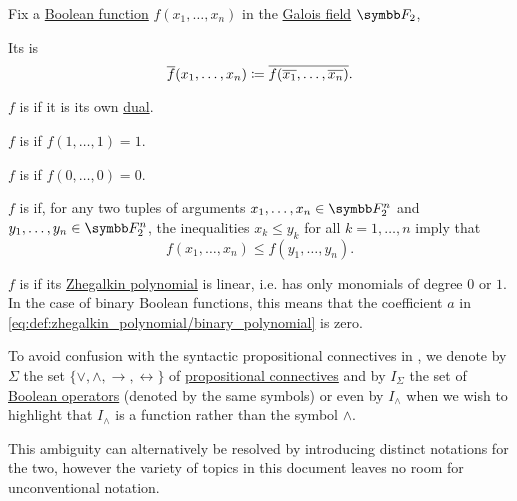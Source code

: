 \begin{definition}\label{def:boolean_functions_in_f2}
  Fix a \hyperref[def:boolean_function]{Boolean function} \( f(x_1, \ldots, x_n) \) in the \hyperref[thm:galois_field_existence]{Galois field} \( \BF_2 \),

  \begin{DefEnum}
     Its  is
    \begin{equation*}
      \overline{f}(x_1, \ldots, x_n) \coloneqq \overline{f(\overline{x_1}, \ldots, \overline{x_n})}.
    \end{equation*}

     \( f \) is  if it is its own \hyperref[def:boolean_function_in_f2/dual]{dual}.

     \( f \) is  if \( f(1, \ldots, 1) = 1 \).

     \( f \) is  if \( f(0, \ldots, 0) = 0 \).

     \( f \) is  if, for any two tuples of arguments \( x_1, \ldots, x_n \in \BF_2^n \) and \( y_1, \ldots, y_n \in \BF_2^n \), the inequalities \( x_k \leq y_k \) for all \( k = 1, \ldots, n \) imply that
    \begin{equation*}
      f(x_1, \ldots, x_n) \leq f(y_1, \ldots, y_n).
    \end{equation*}

     \( f \) is  if its \hyperref[def:zhegalkin_polynomial]{Zhegalkin polynomial} is linear, i.e. has only monomials of degree \( 0 \) or \( 1 \). In the case of binary Boolean functions, this means that the coefficient \( a \) in \eqref{eq:def:zhegalkin_polynomial/binary_polynomial} is zero.
  \end{DefEnum}
\end{definition}

\begin{remark}\label{thm:propositional_connectives_ambiguity}
  To avoid confusion with the syntactic propositional connectives in , we denote by \( \Sigma \) the set \( \{ \vee, \wedge, \rightarrow, \leftrightarrow \} \) of \hyperref[def:propositional_alphabet/connectives]{propositional connectives} and by \( I_\Sigma \) the set of \hyperref[def:boolean_operators]{Boolean operators} (denoted by the same symbols) or even by \( I_\wedge \) when we wish to highlight that \( I_\wedge \) is a function rather than the symbol \( \wedge \).

  This ambiguity can alternatively be resolved by introducing distinct notations for the two, however the variety of topics in this document leaves no room for unconventional notation.
\end{remark}

